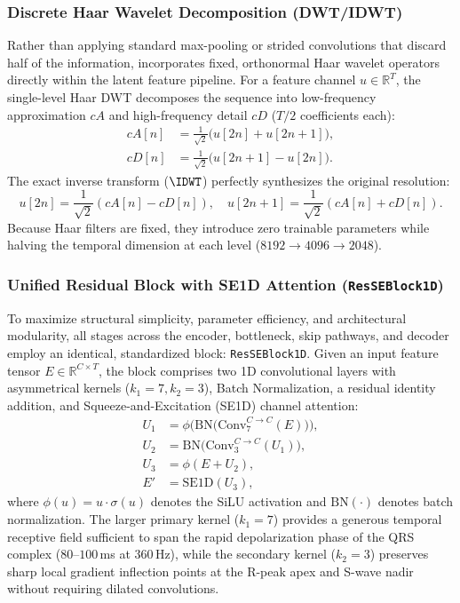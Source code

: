 \subsubsection{Discrete Haar Wavelet Decomposition (DWT/IDWT)}
Rather than applying standard max-pooling or strided convolutions that discard half of the information, \HSL{} incorporates fixed, orthonormal Haar wavelet operators directly within the latent feature pipeline. For a feature channel $u \in \mathbb{R}^T$, the single-level Haar DWT decomposes the sequence into low-frequency approximation $cA$ and high-frequency detail $cD$ ($T/2$ coefficients each):
\begin{align}
cA[n] &= \frac{1}{\sqrt{2}}\big(u[2n] + u[2n+1]\big), \\
cD[n] &= \frac{1}{\sqrt{2}}\big(u[2n+1] - u[2n]\big).
\end{align}
The exact inverse transform ($\IDWT$) perfectly synthesizes the original resolution:
\begin{equation}
u[2n] = \frac{1}{\sqrt{2}}(cA[n] - cD[n]), \quad u[2n+1] = \frac{1}{\sqrt{2}}(cA[n] + cD[n]).
\end{equation}
Because Haar filters are fixed, they introduce zero trainable parameters while halving the temporal dimension at each level ($8192 \to 4096 \to 2048$).

\subsubsection{Unified Residual Block with SE1D Attention (\texttt{ResSEBlock1D})}
To maximize structural simplicity, parameter efficiency, and architectural modularity, all stages across the encoder, bottleneck, skip pathways, and decoder employ an identical, standardized block: \texttt{ResSEBlock1D}. Given an input feature tensor $E \in \mathbb{R}^{C \times T}$, the block comprises two 1D convolutional layers with asymmetrical kernels ($k_1=7, k_2=3$), Batch Normalization, a residual identity addition, and Squeeze-and-Excitation (SE1D) channel attention:
\begin{align}
U_1 &= \phi\Big(\mathrm{BN}\big(\mathrm{Conv}_{7}^{C \to C}(E)\big)\Big), \\
U_2 &= \mathrm{BN}\big(\mathrm{Conv}_{3}^{C \to C}(U_1)\big), \\
U_3 &= \phi(E + U_2), \\
E'  &= \mathrm{SE1D}(U_3),
\end{align}
where $\phi(u) = u \cdot \sigma(u)$ denotes the SiLU activation and $\mathrm{BN}(\cdot)$ denotes batch normalization. The larger primary kernel ($k_1=7$) provides a generous temporal receptive field sufficient to span the rapid depolarization phase of the QRS complex ($80$--$100$\,ms at $360$\,Hz), while the secondary kernel ($k_2=3$) preserves sharp local gradient inflection points at the R-peak apex and S-wave nadir without requiring dilated convolutions.

